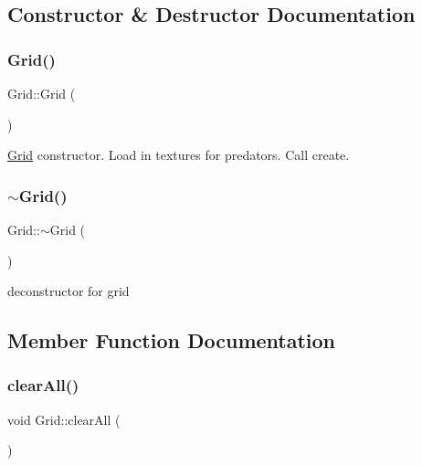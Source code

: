 \subsection{Constructor \& Destructor Documentation}
\mbox{\label{class_grid_a4ac9ff4f63552b4c61ff90fcb35ad66c}} 
\subsubsection{\texorpdfstring{Grid()}{Grid()}}
{\footnotesize\ttfamily Grid\+::\+Grid (\begin{DoxyParamCaption}{ }\end{DoxyParamCaption})}



\mbox{\hyperlink{class_grid}{Grid}} constructor. Load in textures for predators. Call create. 

\mbox{\label{class_grid_a3661d0a7f998caaaf8627d7a67072116}} 
\subsubsection{\texorpdfstring{$\sim$Grid()}{~Grid()}}
{\footnotesize\ttfamily Grid\+::$\sim$\+Grid (\begin{DoxyParamCaption}{ }\end{DoxyParamCaption})}



deconstructor for grid 



\subsection{Member Function Documentation}
\mbox{\label{class_grid_ad87359494dcfba12f838b621869794ae}} 
\subsubsection{\texorpdfstring{clearAll()}{clearAll()}}
{\footnotesize\ttfamily void Grid\+::clear\+All (\begin{DoxyParamCaption}{ }\end{DoxyParamCaption})\hspace{0.3cm}{\ttfamily [private]}}



